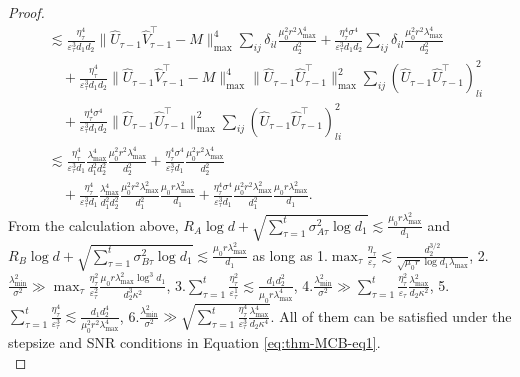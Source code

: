 \documentclass[12pt]{article}
\theoremstyle{plain}
\begin{document}
\begin{proof}
\begin{align*}
    &\lesssim \frac{\eta_{\tau}^4}{\varepsilon_{\tau}^3 d_1d_2}\|\widehat{U}_{\tau-1}\widehat{V}_{\tau-1}^{\top} - M\|_{\max}^4\sum_{ij}\delta_{il}\frac{\mu_0^2r^2\lambda_{\max}^4}{d_2^2} + \frac{\eta_{\tau}^4\sigma^4}{\varepsilon_{\tau}^3 d_1d_2}\sum_{ij}\delta_{il}\frac{\mu_0^2r^2\lambda_{\max}^4}{d_2^2} \\ &\quad + \frac{\eta_{\tau}^4}{\varepsilon_{\tau}^3 d_1d_2}\|\widehat{U}_{\tau-1}\widehat{V}_{\tau-1}^{\top} - M\|_{\max}^4\|\widehat{U}_{\tau-1}\widehat{U}_{\tau-1}^{\top}\|_{\max}^2\sum_{ij}(\widehat{U}_{\tau-1}\widehat{U}_{\tau-1}^{\top})_{li}^2 \\ &\quad + \frac{\eta_{\tau}^4\sigma^4}{\varepsilon_{\tau}^3 d_1d_2}\|\widehat{U}_{\tau-1}\widehat{U}_{\tau-1}^{\top}\|_{\max}^2\sum_{ij}(\widehat{U}_{\tau-1}\widehat{U}_{\tau-1}^{\top})_{li}^2 \\
    &\lesssim \frac{\eta_{\tau}^4}{\varepsilon_{\tau}^3 d_1}\frac{\lambda_{\max}^4}{d_1^2d_2^2}\frac{\mu_0^2r^2\lambda_{\max}^4}{d_2^2} + \frac{\eta_{\tau}^4\sigma^4}{\varepsilon_{\tau}^3 d_1}\frac{\mu_0^2r^2\lambda_{\max}^4}{d_2^2} \\ &\quad + \frac{\eta_{\tau}^4}{\varepsilon_{\tau}^3 d_1}\frac{\lambda_{\max}^4}{d_1^2d_2^2}\frac{\mu_0^2r^2\lambda_{\max}^2}{d_1^2}\frac{\mu_0r\lambda_{\max}^2}{d_1} + \frac{\eta_{\tau}^4\sigma^4}{\varepsilon_{\tau}^3 d_1}\frac{\mu_0^2r^2\lambda_{\max}^2}{d_1^2}\frac{\mu_0r\lambda_{\max}^2}{d_1}.
\end{align*}
From the calculation above, $R_A\log d + \sqrt{\sum_{\tau=1}^t \sigma_{A\tau}^2\log d_1}\lesssim \frac{\mu_0r\lambda_{\max}^2}{d_1}$ and $R_B\log d + \sqrt{\sum_{\tau=1}^t \sigma_{B\tau}^2\log d_1}\lesssim \frac{\mu_0r\lambda_{\max}^2}{d_1}$ as long as 1.$\max_{\tau}\frac{\eta_{\tau}}{\varepsilon_{\tau}}\lesssim \frac{d_2^{3/2}}{\sqrt{\mu_0r}\log d_1\lambda_{\max}}$, 2.$\frac{\lambda_{\min}^2}{\sigma^2}\gg\max_{\tau} \frac{\eta_{\tau}^2}{\varepsilon_{\tau}^2}\frac{\mu_0r\lambda_{\max}^2\log^3 d_1}{d_2^3\kappa^2}$, 3.$\sum_{\tau=1}^t \frac{\eta_{\tau}^2}{\varepsilon_{\tau}^1}\lesssim \frac{d_1d_2^2}{\mu_0r\lambda_{\max}^4}$, 4.$\frac{\lambda_{\min}^2}{\sigma^2}\gg \sum_{\tau=1}^{t} \frac{\eta_{\tau}^2}{\varepsilon_{\tau}}\frac{\lambda_{\max}^2}{d_2\kappa^2}$, 5.$\sum_{\tau=1}^t \frac{\eta_{\tau}^4}{\varepsilon_{\tau}^3}\lesssim \frac{d_1d_2^4}{\mu_0^2r^2\lambda_{\max}^4}$, 6.$\frac{\lambda_{\min}^2}{\sigma^2}\gg \sqrt{\sum_{\tau=1}^{t} \frac{\eta_{\tau}^4}{\varepsilon_{\tau}^3}\frac{\lambda_{\max}^4}{d_2\kappa^4}}$. All of them can be satisfied under the stepsize and SNR conditions in Equation \ref{eq:thm-MCB-eq1}.\\

\end{proof}
\end{document}
